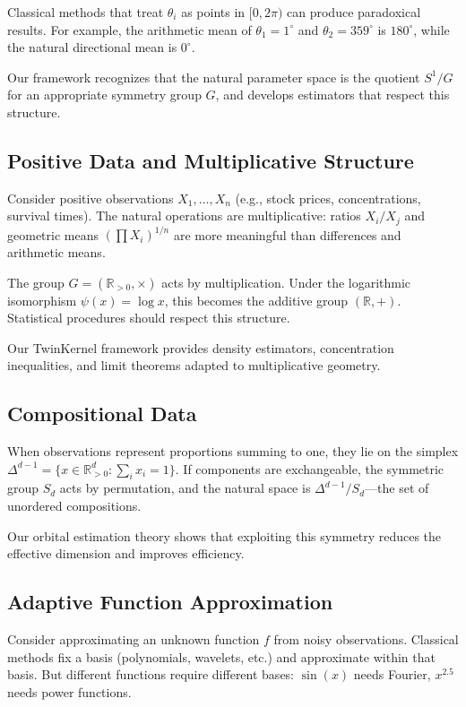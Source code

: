 \documentclass[11pt,twoside,openright]{book}
\theoremstyle{plain}
\theoremstyle{definition}
\theoremstyle{remark}
\newcommand{\Rd}{\mathbb{R}}
\begin{document}
Classical methods that treat $\theta_i$ as points in $[0, 2\pi)$ can produce paradoxical results. For example, the arithmetic mean of $\theta_1 = 1^\circ$ and $\theta_2 = 359^\circ$ is $180^\circ$, while the natural directional mean is $0^\circ$.

Our framework recognizes that the natural parameter space is the quotient $S^1/G$ for an appropriate symmetry group $G$, and develops estimators that respect this structure.

\subsection{Positive Data and Multiplicative Structure}

Consider positive observations $X_1, \ldots, X_n$ (e.g., stock prices, concentrations, survival times). The natural operations are multiplicative: ratios $X_i/X_j$ and geometric means $(\prod X_i)^{1/n}$ are more meaningful than differences and arithmetic means.

The group $G = (\Rd_{>0}, \times)$ acts by multiplication. Under the logarithmic isomorphism $\psi(x) = \log x$, this becomes the additive group $(\Rd, +)$. Statistical procedures should respect this structure.

Our TwinKernel framework provides density estimators, concentration inequalities, and limit theorems adapted to multiplicative geometry.

\subsection{Compositional Data}

When observations represent proportions summing to one, they lie on the simplex $\Delta^{d-1} = \{x \in \Rd^d_{>0} : \sum_i x_i = 1\}$. If components are exchangeable, the symmetric group $S_d$ acts by permutation, and the natural space is $\Delta^{d-1}/S_d$---the set of unordered compositions.

Our orbital estimation theory shows that exploiting this symmetry reduces the effective dimension and improves efficiency.

\subsection{Adaptive Function Approximation}

Consider approximating an unknown function $f$ from noisy observations. Classical methods fix a basis (polynomials, wavelets, etc.) and approximate within that basis. But different functions require different bases: $\sin(x)$ needs Fourier, $x^{2.5}$ needs power functions.
\end{document}
